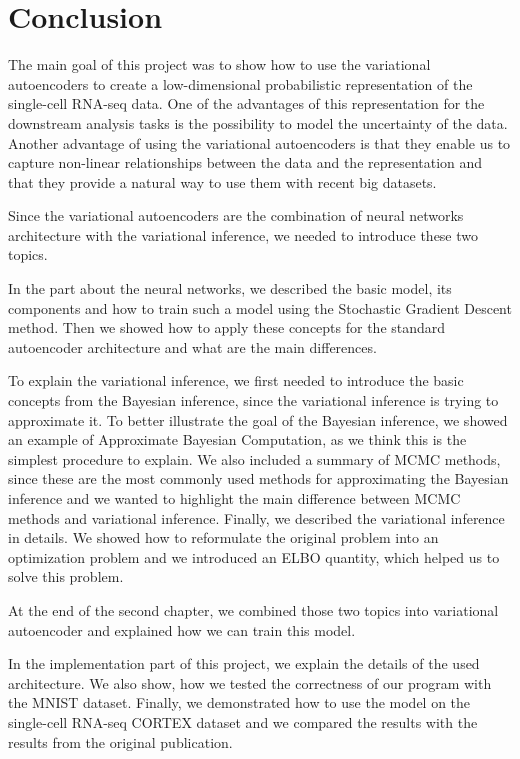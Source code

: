 \chapter{Conclusion}
\label{chap:conclusion}

The main goal of this project was to show how to use the variational autoencoders to create a low-dimensional probabilistic representation of the single-cell RNA-seq data.
One of the advantages of this representation for the downstream analysis tasks is the possibility to model the uncertainty of the data.
Another advantage of using the variational autoencoders is that they enable us to capture non-linear relationships between the data and the representation and that they provide a natural way to use them with recent big datasets.

Since the variational autoencoders are the combination of neural networks architecture with the variational inference, we needed to introduce these two topics.

In the part about the neural networks, we described the basic model, its components and how to train such a model using the Stochastic Gradient Descent method.
Then we showed how to apply these concepts for the standard autoencoder architecture and what are the main differences.

To explain the variational inference, we first needed to introduce the basic concepts from the Bayesian inference, since the variational inference is trying to approximate it.
To better illustrate the goal of the Bayesian inference, we showed an example of Approximate Bayesian Computation, as we think this is the simplest procedure to explain.
We also included a summary of MCMC methods, since these are the most commonly used methods for approximating the Bayesian inference and we wanted to highlight the main difference between MCMC methods and variational inference.
Finally, we described the variational inference in details.
We showed how to reformulate the original problem into an optimization problem and we introduced an ELBO quantity, which helped us to solve this problem.

At the end of the second chapter, we combined those two topics into variational autoencoder and explained how we can train this model.

In the implementation part of this project, we explain the details of the used architecture.
We also show, how we tested the correctness of our program with the MNIST dataset.
Finally, we demonstrated how to use the model on the single-cell RNA-seq CORTEX dataset and we compared the results with the results from the original publication.